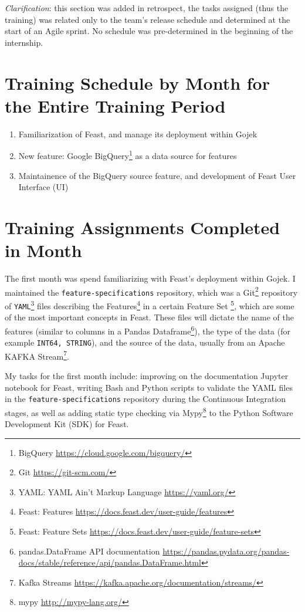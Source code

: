 \documentclass[a4paper, 12pt, fleqn]{report}
\begin{document}
\emph{Clarification}: this section was added in retrospect, the tasks assigned
(thus the training) was related only to the team's release schedule and
determined at the start of an Agile sprint. No schedule was pre-determined in
the beginning of the internship.

\section{Training Schedule by Month for the Entire Training Period}
\begin{enumerate}
  \item Familiarization of Feast, and manage its deployment within Gojek
  \item New feature: Google BigQuery\footnote{BigQuery
    \url{https://cloud.google.com/bigquery/}} as a data source for features
  \item Maintainence of the BigQuery source feature, and development of Feast
    User Interface (UI)
\end{enumerate}

\section{Training Assignments Completed in  Month}
The first month was spend familiarizing with Feast's deployment within Gojek. I
maintained the \texttt{feature-specifications} repository, which was a
Git\footnote{Git \url{https://git-scm.com/}} repository of
\texttt{YAML}\footnote{YAML: YAML Ain't Markup Language \url{https://yaml.org/}}
files describing the Features\footnote{Feast: Features
  \url{https://docs.feast.dev/user-guide/features}} in a certain Feature Set
\footnote{Feast: Feature Sets
  \url{https://docs.feast.dev/user-guide/feature-sets}}, which are some of the
most important concepts in Feast. These files will dictate the name of the
features (similar to columns in a Pandas Dataframe\footnote{pandas.DataFrame API
  documentation
  \url{https://pandas.pydata.org/pandas-docs/stable/reference/api/pandas.DataFrame.html}}),
the type of the data (for example \texttt{INT64, STRING}), and the source of the
data, usually from an Apache KAFKA Stream\footnote{Kafka Streams
  \url{https://kafka.apache.org/documentation/streams/}}. \newline

My tasks for the first month include: improving on the documentation Jupyter
notebook for Feast, writing Bash and Python scripts to validate the YAML files
in the \texttt{feature-specifications} repository during the Continuous
Integration stages, as well as adding static type checking via
Mypy\footnote{mypy \url{http://mypy-lang.org/}} to the Python Software
Development Kit (SDK) for Feast.
\end{document}
